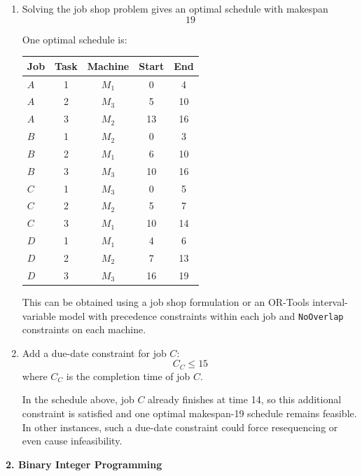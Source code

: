 \documentclass[11pt,a4paper]{article}
\begin{document}
\begin{enumerate}
So Johnson's Rule improves the schedule by
\[
39-34=5
\]
time units.

\item Solving the job shop problem gives an optimal schedule with makespan
\[
19
\]

One optimal schedule is:

\begin{center}
\begin{tabular}{lcccc}
\toprule
Job & Task & Machine & Start & End \\
\midrule
$A$ & 1 & $M_1$ & 0 & 4 \\
$A$ & 2 & $M_3$ & 5 & 10 \\
$A$ & 3 & $M_2$ & 13 & 16 \\
$B$ & 1 & $M_2$ & 0 & 3 \\
$B$ & 2 & $M_1$ & 6 & 10 \\
$B$ & 3 & $M_3$ & 10 & 16 \\
$C$ & 1 & $M_3$ & 0 & 5 \\
$C$ & 2 & $M_2$ & 5 & 7 \\
$C$ & 3 & $M_1$ & 10 & 14 \\
$D$ & 1 & $M_1$ & 4 & 6 \\
$D$ & 2 & $M_2$ & 7 & 13 \\
$D$ & 3 & $M_3$ & 16 & 19 \\
\bottomrule
\end{tabular}
\end{center}

This can be obtained using a job shop formulation or an OR-Tools interval-variable model with precedence constraints within each job and \texttt{NoOverlap} constraints on each machine.

\item Add a due-date constraint for job $C$:
\[
C_C \le 15
\]
where $C_C$ is the completion time of job $C$.

In the schedule above, job $C$ already finishes at time 14, so this additional constraint is satisfied and one optimal makespan-19 schedule remains feasible. In other instances, such a due-date constraint could force resequencing or even cause infeasibility.
\end{enumerate}

\textbf{2. Binary Integer Programming}
\end{document}
